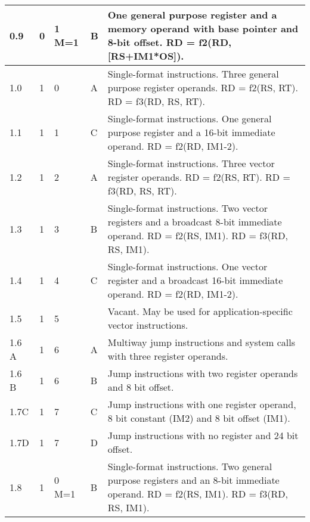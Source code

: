\documentclass[forwardcom.tex]{subfiles}
\begin{document}
\begin{longtable} {|p{10mm}|p{6mm}|p{9mm}|p{7mm}|p{80mm}|}
\hline
0.9 & 0 & 1 M=1 & B & One general purpose register and a memory operand with base pointer and 8-bit offset. \newline
RD = f2(RD, [RS+IM1*OS]).\\

\hline
1.0 & 1 & 0 & A & Single-format instructions. Three general purpose register operands. \newline 
RD = f2(RS, RT). RD = f3(RD, RS, RT).\\

\hline
1.1 & 1 & 1 & C & Single-format instructions. One general purpose register and a 16-bit immediate operand. \newline 
RD = f2(RD, IM1-2).\\

\hline
1.2 & 1 & 2 & A & Single-format instructions. Three vector register operands. \newline 
RD = f2(RS, RT). RD = f3(RD, RS, RT).\\

\hline
1.3 & 1 & 3 & B & Single-format instructions. Two vector registers and a broadcast 8-bit immediate operand. \newline 
RD = f2(RS, IM1). RD = f3(RD, RS, IM1). \\

\hline
1.4 & 1 & 4 & C & Single-format instructions. One vector register and a broadcast 16-bit immediate operand. \newline 
RD = f2(RD, IM1-2). \\

\hline
1.5 & 1 & 5 &  & Vacant. May be used for application-specific vector instructions. \\

\hline
1.6 A & 1 & 6 & A & Multiway jump instructions and system calls with three register operands.\\

\hline
1.6 B & 1 & 6 & B & Jump instructions with two register operands and 8 bit offset.\\

\hline
1.7C & 1 & 7 & C & Jump instructions with one register operand, 8 bit constant (IM2) and 8 bit offset (IM1).\\

\hline
1.7D & 1 & 7 & D & Jump instructions with no register and 24 bit offset.  \\

\hline
1.8 & 1 & 0 M=1 & B & Single-format instructions. Two general purpose registers and an 8-bit immediate operand.\newline 
RD = f2(RS, IM1). RD = f3(RD, RS, IM1).\\


\end{longtable}
\end{document}
